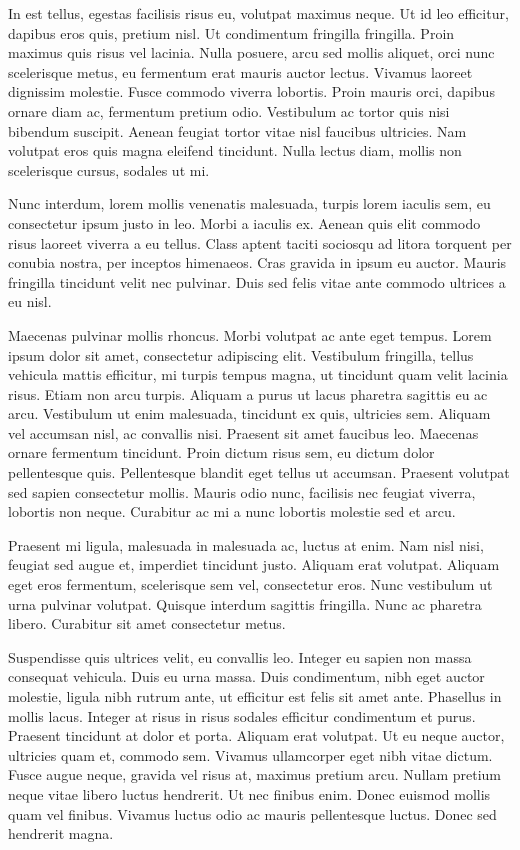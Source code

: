 In est tellus, egestas facilisis risus eu, volutpat maximus neque. Ut id leo efficitur, dapibus eros quis, pretium nisl. Ut condimentum fringilla fringilla. Proin maximus quis risus vel lacinia. Nulla posuere, arcu sed mollis aliquet, orci nunc scelerisque metus, eu fermentum erat mauris auctor lectus. Vivamus laoreet dignissim molestie. Fusce commodo viverra lobortis. Proin mauris orci, dapibus ornare diam ac, fermentum pretium odio. Vestibulum ac tortor quis nisi bibendum suscipit. Aenean feugiat tortor vitae nisl faucibus ultricies. Nam volutpat eros quis magna eleifend tincidunt. Nulla lectus diam, mollis non scelerisque cursus, sodales ut mi.

Nunc interdum, lorem mollis venenatis malesuada, turpis lorem iaculis sem, eu consectetur ipsum justo in leo. Morbi a iaculis ex. Aenean quis elit commodo risus laoreet viverra a eu tellus. Class aptent taciti sociosqu ad litora torquent per conubia nostra, per inceptos himenaeos. Cras gravida in ipsum eu auctor. Mauris fringilla tincidunt velit nec pulvinar. Duis sed felis vitae ante commodo ultrices a eu nisl.

Maecenas pulvinar mollis rhoncus. Morbi volutpat ac ante eget tempus. Lorem ipsum dolor sit amet, consectetur adipiscing elit. Vestibulum fringilla, tellus vehicula mattis efficitur, mi turpis tempus magna, ut tincidunt quam velit lacinia risus. Etiam non arcu turpis. Aliquam a purus ut lacus pharetra sagittis eu ac arcu. Vestibulum ut enim malesuada, tincidunt ex quis, ultricies sem. Aliquam vel accumsan nisl, ac convallis nisi. Praesent sit amet faucibus leo. Maecenas ornare fermentum tincidunt. Proin dictum risus sem, eu dictum dolor pellentesque quis. Pellentesque blandit eget tellus ut accumsan. Praesent volutpat sed sapien consectetur mollis. Mauris odio nunc, facilisis nec feugiat viverra, lobortis non neque. Curabitur ac mi a nunc lobortis molestie sed et arcu.

Praesent mi ligula, malesuada in malesuada ac, luctus at enim. Nam nisl nisi, feugiat sed augue et, imperdiet tincidunt justo. Aliquam erat volutpat. Aliquam eget eros fermentum, scelerisque sem vel, consectetur eros. Nunc vestibulum ut urna pulvinar volutpat. Quisque interdum sagittis fringilla. Nunc ac pharetra libero. Curabitur sit amet consectetur metus.

Suspendisse quis ultrices velit, eu convallis leo. Integer eu sapien non massa consequat vehicula. Duis eu urna massa. Duis condimentum, nibh eget auctor molestie, ligula nibh rutrum ante, ut efficitur est felis sit amet ante. Phasellus in mollis lacus. Integer at risus in risus sodales efficitur condimentum et purus. Praesent tincidunt at dolor et porta. Aliquam erat volutpat. Ut eu neque auctor, ultricies quam et, commodo sem. Vivamus ullamcorper eget nibh vitae dictum. Fusce augue neque, gravida vel risus at, maximus pretium arcu. Nullam pretium neque vitae libero luctus hendrerit. Ut nec finibus enim. Donec euismod mollis quam vel finibus. Vivamus luctus odio ac mauris pellentesque luctus. Donec sed hendrerit magna.

